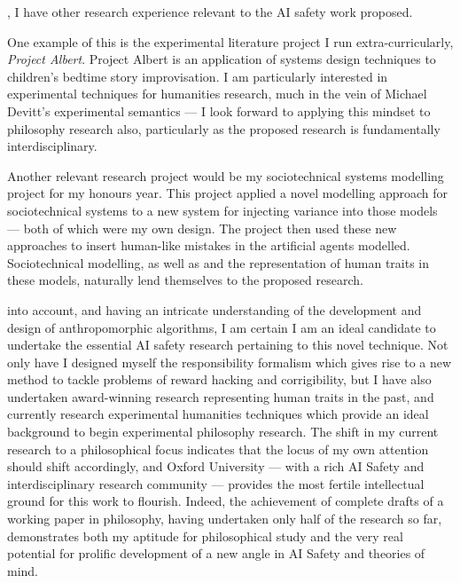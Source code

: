 , I have other research experience relevant to the AI safety work proposed.\par
One example of this is the experimental literature project I run extra-curricularly, \emph{Project Albert}. Project Albert is an application of systems design techniques to children's bedtime story improvisation. I am particularly interested in experimental techniques for humanities research, much in the vein of Michael Devitt's experimental semantics --- I look forward to applying this mindset to philosophy research also, particularly as the proposed research is fundamentally interdisciplinary.\par
Another relevant research project would be my sociotechnical systems modelling project for my honours year. This project applied a novel modelling approach for sociotechnical systems to a new system for injecting variance into those models --- both of which were my own design. The project then used these new approaches to insert human-like mistakes in the artificial agents modelled. Sociotechnical modelling, as well as and the representation of human traits in these models, naturally lend themselves to the proposed research.\par

 into account, and having an intricate understanding of the development and design of anthropomorphic algorithms, I am certain I am an ideal candidate to undertake the essential AI safety research pertaining to this novel technique. Not only have I designed myself the responsibility formalism which gives rise to a new method to tackle problems of reward hacking and corrigibility, but I have also undertaken award-winning research representing human traits in the past, and currently research experimental humanities techniques which provide an ideal background to begin experimental philosophy research. The shift in my current research to a philosophical focus indicates that the locus of my own attention should shift accordingly, and Oxford University --- with a rich AI Safety and interdisciplinary research community --- provides the most fertile intellectual ground for this work to flourish. Indeed, the achievement of complete drafts of a working paper in philosophy\cite{wallis_2016}, having undertaken only half of the research so far, demonstrates both my aptitude for philosophical study and the very real potential for prolific development of a new angle in AI Safety and theories of mind.\par


